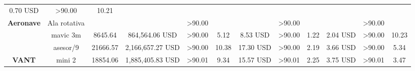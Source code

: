 \begin{table}[]
{\begin{tabular}{cc|ccc|ccc|ccc|c|}
  \multicolumn{1}{c|}{0.70 USD} &
  \textgreater{}90.00 &
  10.21 \\ \cline{2-12} 
\multicolumn{1}{|c|}{\multirow{-2}{*}{\cellcolor[HTML]{9698ED}\textbf{Aeronave}}} &
  \cellcolor[HTML]{9698ED}Ala rotativa &
  \multicolumn{1}{c|}{} &
  \multicolumn{1}{c|}{} &
  \textgreater{}90.00 &
  \multicolumn{1}{c|}{} &
  \multicolumn{1}{c|}{} &
  \textgreater{}90.00 &
  \multicolumn{1}{c|}{} &
  \multicolumn{1}{c|}{} &
  \textgreater{}90.00 &
   \\ \hline
\multicolumn{1}{|c|}{\cellcolor[HTML]{9698ED}} &
  \cellcolor[HTML]{9698ED}mavic 3m &
  \multicolumn{1}{c|}{8645.64} &
  \multicolumn{1}{c|}{864,564.06 USD} &
  \textgreater{}90.00 &
  \multicolumn{1}{c|}{5.12} &
  \multicolumn{1}{c|}{8.53 USD} &
  \textgreater{}90.00 &
  \multicolumn{1}{c|}{1.22} &
  \multicolumn{1}{c|}{2.04 USD} &
  \textgreater{}90.00 &
  10.23 \\ \cline{2-12} 
\multicolumn{1}{|c|}{\cellcolor[HTML]{9698ED}} &
  \cellcolor[HTML]{9698ED}asesor/9 &
  \multicolumn{1}{c|}{21666.57} &
  \multicolumn{1}{c|}{2,166,657.27 USD} &
  \textgreater{}90.00 &
  \multicolumn{1}{c|}{10.38} &
  \multicolumn{1}{c|}{17.30 USD} &
  \textgreater{}90.00 &
  \multicolumn{1}{c|}{2.19} &
  \multicolumn{1}{c|}{3.66 USD} &
  \textgreater{}90.00 &
  5.34 \\ \cline{2-12} 
\multicolumn{1}{|c|}{\multirow{-3}{*}{\cellcolor[HTML]{9698ED}\textbf{VANT}}} &
  \cellcolor[HTML]{9698ED}mini 2 &
  \multicolumn{1}{c|}{18854.06} &
  \multicolumn{1}{c|}{1,885,405.83 USD} &
  \textgreater{}90.01 &
  \multicolumn{1}{c|}{9.34} &
  \multicolumn{1}{c|}{15.57 USD} &
  \textgreater{}90.01 &
  \multicolumn{1}{c|}{2.25} &
  \multicolumn{1}{c|}{3.75 USD} &
  \textgreater{}90.01 &
  3.47 \\ \hline
\end{tabular}%
}
\end{table}
